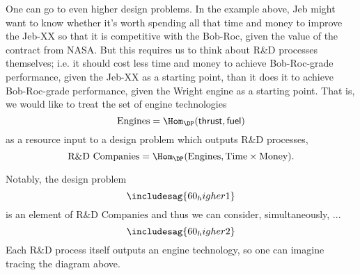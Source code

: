 One can go to even higher design problems. In the example above, Jeb might want to know whether it's worth spending all that time and money to improve the Jeb-XX so that it is competitive with the Bob-Roc, given the value of the contract from NASA. But this requires us to think about R\&D processes themselves; i.e. it should cost less time and money to achieve Bob-Roc-grade performance, given the Jeb-XX as a starting point, than it does it to achieve Bob-Roc-grade performance, given the Wright engine as a starting point. That is, we would like to treat the set of engine technologies
\[\text{Engines} = \Hom_\DP(\mathsf{thrust}, \mathsf{fuel})\]
as a resource input to a design problem which outputs R\&D processes,
\[\text{R\&D Companies} = \Hom_\DP(\text{Engines}, \text{Time} \times \text{Money}).\]

Notably, the design problem
\[
  \includesag{60_higher1}
\]
is an element of $\text{R\&D Companies}$ and thus we can consider, simultaneously, ...
\[
  \includesag{60_higher2}
\]
Each R\&D process itself outputs an engine technology, so one can imagine tracing the diagram above.
